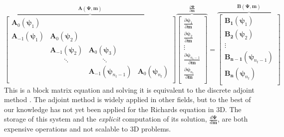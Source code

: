 \documentclass[preprint,review,3p,times,onecolumn,authoryear]{elsarticle}
\newcommand{\deriv}[2]{\frac{d #1}{d #2}}
\newcommand{\bfm}{\mathbf{m}}
\newcommand{\bfPsi}{\boldsymbol{\Psi}}
\begin{document}
\begin{equation}
\label{eq:richards-timestep-deriv-matrix}
\overbrace{
    \left[
    \begin{array}{cccc}
        \mathbf{A}_0(\boldsymbol{\psi}_1)\\
        \mathbf{A}_{-1}(\boldsymbol{\psi}_1)&\mathbf{A}_0(\boldsymbol{\psi}_2)\\
        &\mathbf{A}_{-1}(\boldsymbol{\psi}_2)&\mathbf{A}_0(\boldsymbol{\psi}_3)\\
        &\qquad\ddots&\qquad\ddots\\
        &&\mathbf{A}_{-1}(\boldsymbol{\psi}_{n_{t}-1})&\mathbf{A}_0(\boldsymbol{\psi}_{n_{t}})\\
    \end{array}
    \right]
}^{\mathbf{A}(\boldsymbol{\Psi},\mathbf{m})}
\overbrace{
    \left[
    \begin{array}{c}
        \frac{\partial \boldsymbol{\psi}_1}{\partial \mathbf{m}}\\
        \frac{\partial \boldsymbol{\psi}_2}{\partial \mathbf{m}}\\
        \vdots\\
        \frac{\partial \boldsymbol{\psi}_{n_{t}-1}}{\partial \mathbf{m}}\\
        \frac{\partial \boldsymbol{\psi}_{n_{t}}}{\partial \mathbf{m}}\\
    \end{array}
    \right]
}^{\frac{\partial\boldsymbol{\Psi}}{\partial\mathbf{m}}}
    =
\overbrace{
    \left[
    \begin{array}{c}
        \mathbf{B_1}(\boldsymbol{\psi}_1)\\
        \mathbf{B_2}(\boldsymbol{\psi}_2)\\
        \vdots\\
        \mathbf{B_{n-1}}(\boldsymbol{\psi}_{n_{t}-1})\\
        \mathbf{B_n}(\boldsymbol{\psi}_{n_{t}})\\
    \end{array}
    \right]
}^{\mathbf{B}(\boldsymbol{\Psi},\mathbf{m})}
\end{equation}
This is a block matrix equation and solving it is equivalent to the discrete adjoint method \citep{Bitterlich2002, DeanChen2011}. The adjoint method is widely applied in other fields, but to the best of our knowledge has not yet been applied for the Richards equation in 3D. The storage of this system and the \emph{explicit} computation of its solution, $\deriv{\bfPsi}{\bfm}$, are both expensive operations and not scalable to 3D problems.
\end{document}
